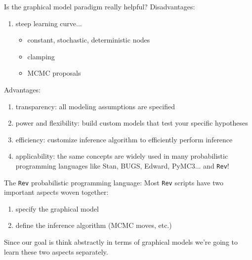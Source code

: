 \documentclass[mathserif]{beamer}
\begin{document}
\begin{frame}
    \begin{block}{Is the graphical model paradigm really helpful?}
    \bigskip
    \small
    Disadvantages: 
    \begin{enumerate}
        \item steep learning curve...
        \begin{itemize}
            \item constant, stochastic, deterministic nodes
            \item clamping
            \item MCMC proposals
        \end{itemize}
    \end{enumerate}
    Advantages: 
    \begin{enumerate}
        \item transparency: all modeling assumptions are specified
        \item power and flexibility: build custom models that test your specific hypotheses 
        \item efficiency: customize inference algorithm to efficiently perform inference 
        \item applicability: the same concepts are widely used in many probabilistic programming languages like Stan, BUGS, Edward, PyMC3... and \texttt{Rev}!
    \end{enumerate}
    \end{block}
\end{frame}


\begin{frame}

    \small
    \begin{block}{The \texttt{Rev} probabilistic programming language:}
    \bigskip
    Most \texttt{Rev} scripts have two important aspects woven together: 
    \begin{enumerate}
        \item specify the graphical model
        \item define the inference algorithm (MCMC moves, etc.)
    \end{enumerate}
    Since our goal is think abstractly in terms of graphical models
     we're going to learn these two aspects separately.
    \end{block}
\end{frame}
\end{document}
